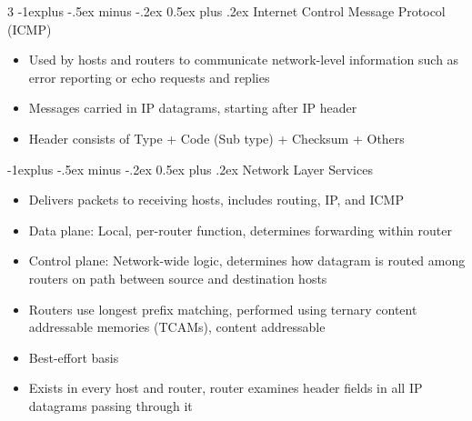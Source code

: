 \documentclass[10pt, landscape]{article}
\makeatletter
\renewcommand{\section}{\@startsection{section}{1}{0mm}%
                                {-1ex plus -.5ex minus -.2ex}%
                                {0.5ex plus .2ex}%
                                {\normalfont\large\bfseries}}
\renewcommand{\section}{\@startsection{section}{2}{0mm}%
                                {-1explus -.5ex minus -.2ex}%
                                {0.5ex plus .2ex}%
                                {\normalfont\normalsize\bfseries}}
\makeatother
\begin{document}
\begin{multicols*}{3}
\section{Internet Control Message Protocol (ICMP)}
\begin{itemize}
    \item Used by hosts and routers to communicate network-level information such as error reporting or echo requests and replies
    \item Messages carried in IP datagrams, starting after IP header
    \item Header consists of Type + Code (Sub type) + Checksum + Others
\end{itemize}

\section{Network Layer Services}
\begin{itemize}
    \item Delivers packets to receiving hosts, includes routing, IP, and ICMP
    \item Data plane: Local, per-router function, determines forwarding within router
    \item Control plane: Network-wide logic, determines how datagram is routed among routers on path between source and destination hosts
    \item Routers use longest prefix matching, performed using ternary content addressable memories (TCAMs), content addressable
    \item Best-effort basis
    \item Exists in every host and router, router examines header fields in all IP datagrams passing through it
\end{itemize}


\end{multicols*}
\end{document}
